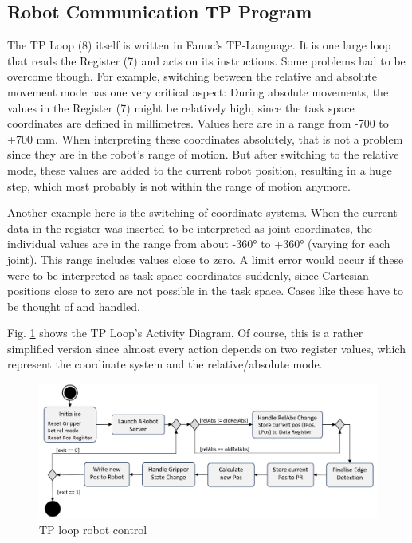\subsection{Robot Communication TP Program}
\label{Section:RobotTPLoop}
The TP Loop (8) itself is written in Fanuc's TP-Language. It is one large loop that reads the Register (7) and acts on its instructions. Some problems had to be overcome though. For example, switching between the relative and absolute movement mode has one very critical aspect: During absolute movements, the values in the Register (7) might be relatively high, since the task space coordinates are defined in millimetres. Values here are in a range from -700 to +700 mm. When interpreting these coordinates absolutely, that is not a problem since they are in the robot's range of motion. But after switching to the relative mode, these values are added to the current robot position, resulting in a huge step, which most probably is not within the range of motion anymore.

Another example here is the switching of coordinate systems. When the current data in the register was inserted to be interpreted as joint coordinates, the individual values are in the range from about -360° to +360° (varying for each joint). This range includes values close to zero. A limit error would occur if these were to be interpreted as task space coordinates suddenly, since Cartesian positions close to zero are not possible in the task space. Cases like these have to be thought of and handled. 

Fig. \ref{Fig:TPLoopFlowChart} shows the TP Loop's Activity Diagram. Of course, this is a rather simplified version since almost every action depends on two register values, which represent the coordinate system and the relative/absolute mode. 

\begin{figure}
	\centering
	\includegraphics[width=0.9\linewidth]{Figures/TPLoopFlowChart.jpg}
	\caption{TP loop robot control}
	\label{Fig:TPLoopFlowChart}
\end{figure}

